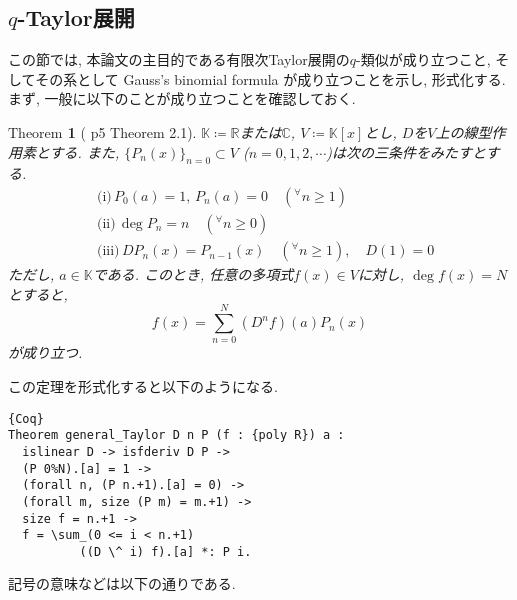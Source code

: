 \documentclass[11pt]{jsreport}
\theoremstyle{mystyle}
\newtheorem{thm}[df]{$\textrm{Theorem}$}
\newcommand{\bthm}{\begin{shadebox} \begin{thm}}
\newcommand{\ethm}{\end{thm} \end{shadebox}}
\newcommand{\bpf}{\begin{proof}}
\newcommand{\epf}{\end{proof}}
\newcommand{\R}{\mathbb{R}}
\newcommand{\C}{\mathbb{C}}
\newcommand{\K}{\mathbb{K}}
\newcommand{\0}{\textbf{0}}
\newcommand{\1}{\textbf{1}}
\newcommand{\2}{\textbf{2}}
\begin{document}
\subsection{$q$-Taylor展開} \label{ssec q_Taylor}
この節では, 本論文の主目的である有限次Taylor展開の$q$-類似が成り立つこと, そしてその系として Gauss's binomial formula が成り立つことを示し, 形式化する. 
まず, 一般に以下のことが成り立つことを確認しておく. 
\bthm[\cite{Kac} p5 Theorem 2.1] \label{general_Taylor}
$\K\coloneqq\R$または$\C$, $V\coloneqq\K[x]$とし, $D$を$V$上の線型作用素とする. また, 
$\{P_n(x)\}_{n=0}\subset V$ ($n=0,1,2,\cdots$)は次の三条件をみたすとする. 
  \begin{align*}
    &\textrm{(i)}\,P_0(a) = 1,\,P_n(a)=0 \quad ({}^{\forall}n\ge1)\\
    &\textrm{(ii)}\,\deg P_n = n \quad ({}^{\forall}n\ge0)\\
    &\textrm{(iii)}\,DP_n(x) = P_{n-1}(x) \quad ({}^{\forall}n\ge1), \quad D(1) = 0
  \end{align*}
ただし, $a\in\K$である. このとき, 任意の多項式$f(x)\in V$に対し, $\deg f(x)=N$とすると, 
  \[
    f(x) = \sum_{n=0}^N(D^nf)(a)P_n(x)
  \]
が成り立つ. 
\ethm
この定理を形式化すると以下のようになる. 
\begin{lstlisting}{Coq}
Theorem general_Taylor D n P (f : {poly R}) a :
  islinear D -> isfderiv D P ->
  (P 0%N).[a] = 1 ->
  (forall n, (P n.+1).[a] = 0) ->
  (forall m, size (P m) = m.+1) ->
  size f = n.+1 ->
  f = \sum_(0 <= i < n.+1)
          ((D \^ i) f).[a] *: P i. \end{lstlisting}
記号の意味などは以下の通りである. 
\end{document}
